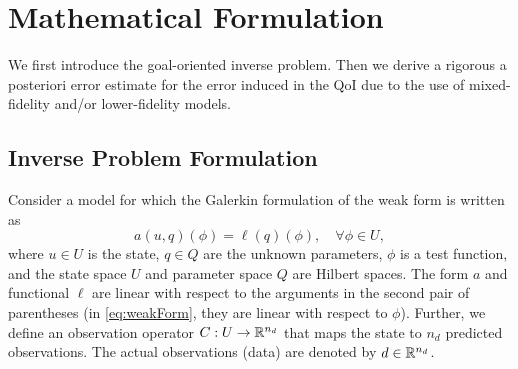 \section{Mathematical Formulation}\label{sec:form}
%
We first introduce the goal-oriented inverse problem. Then we derive a rigorous a posteriori error estimate for the error induced in the QoI due to the use of mixed-fidelity and/or lower-fidelity models.

\subsection{Inverse Problem Formulation}  \label{sec:setup}
%
Consider a model for which the Galerkin formulation of the weak form is written as
\begin{equation}
a(u,q)(\phi)=\ell(q)(\phi),\quad\forall\phi\in U,
\label{eq:weakForm}
\end{equation}
where $u\in U$ is the state, $q\in Q$ are the unknown parameters, $\phi$ is a test function, and the state space $U$ and parameter space $Q$ are Hilbert spaces. The form $a$ and functional $\ell$ are linear with respect to the arguments in the second pair of parentheses (in \cref{eq:weakForm}, they are linear with respect to $\phi$). Further, we define an observation operator $C:U\to{\mathbb{R}}^{n_d}$ that maps the state to $n_d$ predicted observations. The actual observations (data) are denoted by $d\in{\mathbb{R}}^{n_d}$.

